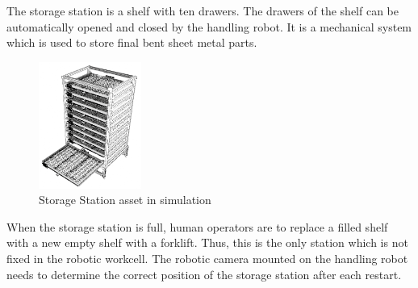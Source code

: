The storage station is a shelf with ten drawers. The drawers of the shelf can be automatically opened and closed by the
handling robot. It is a mechanical system which is used to store final bent sheet metal parts.

\begin{figure}[h]
    \centering
    \includegraphics[width=0.3\textwidth]{figures/storage-station-blender.png}
    \caption{Storage Station asset in simulation}
    \label{fig:storage-station}
\end{figure}

When the storage station is full, human operators are to replace a filled shelf with a new empty shelf with a forklift. Thus, this is the only station
which is not fixed in the robotic workcell. The robotic camera mounted on the handling robot needs to determine the correct position of the storage station
after each restart.